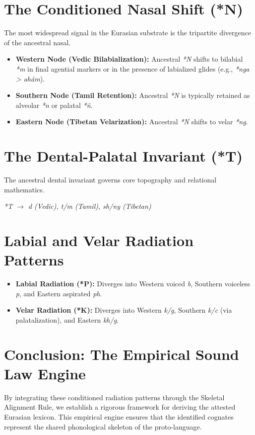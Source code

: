 \section{The Conditioned Nasal Shift (*N)}
The most widespread signal in the Eurasian substrate is the tripartite divergence of the ancestral nasal.
\begin{itemize}
    \item \textbf{Western Node (Vedic Bilabialization):} Ancestral \textit{*N} shifts to bilabial \textit{*m} in final agential markers or in the presence of labialized glides (e.g., \textit{*nga > ahám}).
    \item \textbf{Southern Node (Tamil Retention):} Ancestral \textit{*N} is typically retained as alveolar \textit{*n} or palatal \textit{*ñ}.
    \item \textbf{Eastern Node (Tibetan Velarization):} Ancestral \textit{*N} shifts to velar \textit{*ng}.
\end{itemize}

\section{The Dental-Palatal Invariant (*T)}
The ancestral dental invariant governs core topography and relational mathematics. 
\begin{center}
\textit{*T $\rightarrow$ d (Vedic), t/m (Tamil), sh/ny (Tibetan)}
\end{center}

\section{Labial and Velar Radiation Patterns}
\begin{itemize}
    \item \textbf{Labial Radiation (*P):} Diverges into Western voiced \textit{b}, Southern voiceless \textit{p}, and Eastern aspirated \textit{ph}.
    \item \textbf{Velar Radiation (*K):} Diverges into Western \textit{k/g}, Southern \textit{k/c} (via palatalization), and Eastern \textit{kh/g}.
\end{itemize}

\section{Conclusion: The Empirical Sound Law Engine}
By integrating these conditioned radiation patterns through the Skeletal Alignment Rule, we establish a rigorous framework for deriving the attested Eurasian lexicon. This empirical engine ensures that the identified cognates represent the shared phonological skeleton of the proto-language.

